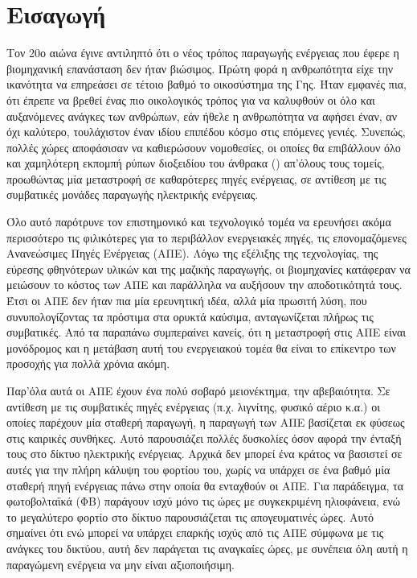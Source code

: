 \documentclass[12pt]{report}
\begin{document}
\chapter*{Εισαγωγή}
Τον 20ο αιώνα έγινε αντιληπτό ότι ο νέος τρόπος παραγωγής ενέργειας που έφερε η βιομηχανική επανάσταση δεν ήταν βιώσιμος. Πρώτη φορά η ανθρωπότητα είχε την ικανότητα να επηρεάσει σε τέτοιο βαθμό το οικοσύστημα της Γης. Ήταν εμφανές 
πια, ότι έπρεπε να βρεθεί ένας πιο οικολογικός τρόπος για να καλυφθούν οι όλο και αυξανόμενες ανάγκες των ανθρώπων, εάν ήθελε η ανθρωπότητα να αφήσει έναν, αν όχι καλύτερο, τουλάχιστον έναν ιδίου επιπέδου κόσμο στις επόμενες γενιές.
Συνεπώς, πολλές χώρες αποφάσισαν να καθιερώσουν νομοθεσίες, οι οποίες θα επιβάλλουν όλο και χαμηλότερη εκπομπή ρύπων διοξειδίου του άνθρακα ({}) απ'όλους τους τομείς, προωθώντας μία μεταστροφή σε καθαρότερες πηγές ενέργειας, σε αντίθεση με τις συμβατικές μονάδες παραγωγής ηλεκτρικής ενέργειας. 

Όλο αυτό παρότρυνε τον επιστημονικό και τεχνολογικό τομέα να ερευνήσει ακόμα περισσότερο τις φιλικότερες για το περιβάλλον ενεργειακές πηγές, τις επονομαζόμενες 
Ανανεώσιμες Πηγές Ενέργειας (ΑΠΕ). Λόγω της εξέλιξης της τεχνολογίας, της εύρεσης φθηνότερων υλικών και της μαζικής παραγωγής, οι βιομηχανίες κατάφεραν να μειώσουν το κόστος των ΑΠΕ και παράλληλα να αυξήσουν την αποδοτικότητά τους.
Έτσι οι ΑΠΕ δεν ήταν πια μία ερευνητική ιδέα, αλλά μία πρωσιτή λύση, που συνυπολογίζοντας τα πρόστιμα στα ορυκτά καύσιμα, ανταγωνίζεται πλήρως τις συμβατικές. Από τα παραπάνω συμπεραίνει κανείς, ότι η μεταστροφή στις ΑΠΕ είναι 
μονόδρομος και η μετάβαση αυτή του ενεργειακού τομέα θα είναι το επίκεντρο των προσοχής για πολλά χρόνια ακόμη.

Παρ'όλα αυτά οι ΑΠΕ έχουν ένα πολύ σοβαρό μειονέκτημα, την αβεβαιότητα. Σε αντίθεση με τις συμβατικές πηγές ενέργειας (π.χ. λιγνίτης, φυσικό αέριο κ.α.) οι οποίες παρέχουν μία σταθερή παραγωγή, η παραγωγή των ΑΠΕ βασίζεται
εκ φύσεως στις καιρικές συνθήκες. Αυτό παρουσιάζει πολλές δυσκολίες όσον αφορά την ένταξή τους στο δίκτυο ηλεκτρικής ενέργειας. Αρχικά δεν μπορεί ένα κράτος να βασιστεί σε αυτές για την πλήρη κάλυψη του φορτίου του, χωρίς να υπάρχει
σε ένα βαθμό μία σταθερή πηγή ενέργειας πάνω στην οποία θα ενταχθούν οι ΑΠΕ. Για παράδειγμα, τα φωτοβολταϊκά (ΦΒ) παράγουν ισχύ μόνο τις ώρες με συγκεκριμένη ηλιοφάνεια, ενώ το μεγαλύτερο φορτίο στο δίκτυο παρουσιάζεται τις
απογευματινές ώρες. Αυτό σημαίνει ότι ενώ μπορεί να υπάρχει επαρκής ισχύς από τις ΑΠΕ σύμφωνα με τις ανάγκες του δικτύου, αυτή δεν παράγεται τις αναγκαίες ώρες, με συνέπεια όλη αυτή η παραγώμενη ενέργεια να μην είναι αξιοποιήσιμη. 
\end{document}
